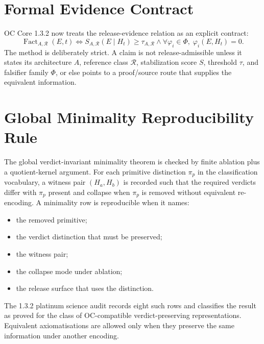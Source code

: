 \documentclass[11pt,a4paper]{article}
\begin{document}
\section*{Formal Evidence Contract}
OC Core 1.3.2 now treats the release-evidence relation as an explicit contract:
\[
  \operatorname{Fact}_{A,\mathcal{R}}(E,t)
  \Longleftrightarrow
  S_{A,\mathcal{R}}(E\mid H_t)\geq \tau_{A,\mathcal{R}}
  \land
  \forall \varphi_i \in \Phi,\;\varphi_i(E,H_t)=0.
\]
The method is deliberately strict. A claim is not release-admissible unless it states its architecture $A$, reference class $\mathcal{R}$, stabilization score $S$, threshold $\tau$, and falsifier family $\Phi$, or else points to a proof/source route that supplies the equivalent information.

\section*{Global Minimality Reproducibility Rule}
The global verdict-invariant minimality theorem is checked by finite ablation plus a quotient-kernel argument. For each primitive distinction $\pi_p$ in the classification vocabulary, a witness pair $(H_a,H_b)$ is recorded such that the required verdicts differ with $\pi_p$ present and collapse when $\pi_p$ is removed without equivalent re-encoding. A minimality row is reproducible when it names:
\begin{itemize}
  \item the removed primitive;
  \item the verdict distinction that must be preserved;
  \item the witness pair;
  \item the collapse mode under ablation;
  \item the release surface that uses the distinction.
\end{itemize}
The 1.3.2 platinum science audit records eight such rows and classifies the result as proved for the class of OC-compatible verdict-preserving representations. Equivalent axiomatisations are allowed only when they preserve the same information under another encoding.
\end{document}
